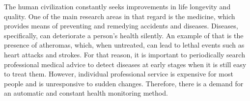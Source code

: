 
The human civilization constantly seeks improvements in life longevity and quality. One of the main research areas in that regard is the medicine, which provides means of preventing and remedying accidents and diseases. Diseases, specifically, can deteriorate a person's health silently. An example of that is the presence of atheromas, which, when untreated, can lead to lethal events such as heart attacks and strokes. For that reason, it is important to periodically search professional medical advice to detect diseases at early stages when it is still easy to treat them. However, individual professional service is expensive for most people and is unresponsive to sudden changes. Therefore, there is a demand for an automatic and constant health monitoring method.  

